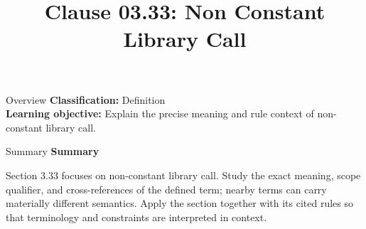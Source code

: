 \documentclass[10pt,letterpaper]{article}
\title{Clause 03.33: Non Constant Library Call}
\author{}
\date{}
\begin{document}
\maketitle
\begin{CornellOverviewBox}{Overview}
\textbf{Classification:} Definition\\[2pt]
\textbf{Learning objective:} Explain the precise meaning and rule context of non-constant library call.
\end{CornellOverviewBox}\begin{CornellSummaryBox}{Summary}
{\sffamily\bfseries\color{Accent} Summary}\par\vspace{3pt}Section 3.33 focuses on non-constant library call. Study the exact meaning, scope qualifier, and cross-references of the defined term; nearby terms can carry materially different semantics. Apply the section together with its cited rules so that terminology and constraints are interpreted in context.
\end{CornellSummaryBox}
\end{document}
